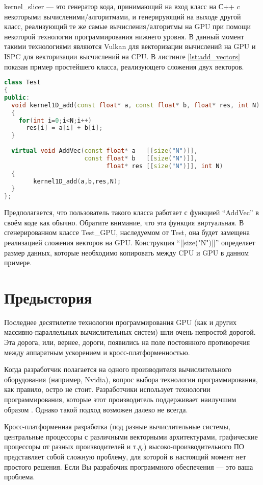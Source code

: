 \documentclass[11pt,fleqn,english,russian]{report} %
\begin{document}
kernel\_slicer --- это генератор кода, принимающий на вход класс на С++ c некоторыми вычисленими/алгоритмами, и генерирующий на выходе другой класс, реализующий те же самые вычисления/алгоритмы на GPU при помощи некоторой технологии программирования нижнего уровня. В данный момент такими технологиями являются Vulkan для векторизации вычислений на GPU и ISPC для векторизации высчислений на CPU. В листинге \ref{lst:add_vectors} показан пример простейшего класса, реализующего сложения двух векторов.

\begin{lstlisting}[language=C++, caption=сложение двух векторов]
class Test 
{
public:	
  void kernel1D_add(const float* a, const float* b, float* res, int N) 
  {
    for(int i=0;i<N;i++)
      res[i] = a[i] + b[i];
  } 
	
  virtual void AddVec(const float* a   [[size("N")]], 
                      const float* b   [[size("N")]], 
                            float* res [[size("N")]], int N) 
  {
		kernel1D_add(a,b,res,N); 
  } 	
};
\end{lstlisting}\label{lst:add_vectors}

Предполагается, что пользователь такого класса работает с функцией ``AddVec'' в своём коде как обычно. Обратите внимание, что эта функция виртуальная. В сгенерированном классе Test\_GPU, наследуемом от Test, она будет замещена реализацией сложения векторов на GPU. Конструкция ``[[size("N")]]'' определяет размер данных, которые необходимо копировать между CPU и GPU в данном примере.

\section{Предыстория}

Последнее десятилетие технологии программирования GPU (как и других массивно-параллельных вычислительных систем) шли очень непростой дорогой. Эта дорога, или, вернее, дороги, появились на поле постоянного противоречия между аппаратным ускорением и кросс-платформенностью. 

Когда разработчик полагается на одного производителя вычислительного оборудования (например, Nvidia), вопрос выбора технологии программирования, как правило, остро не стоит. Разработчики использует технологии программирования, которые этот производитель поддерживает наилучшим образом \cite{NVCPP,CUDA,OpenACC}. Однако такой подход возможен далеко не всегда. 

Кросс-платформенная разработка (под разные вычислительные системы, центральные процессоры с различными векторными архитектурами, графические процессоры от разных производителей и т.д.)  высоко-производительного ПО представляет собой сложную проблему, для которой в настоящий момент нет простого решения. Если Вы разрабочик программного обеспечения --- это ваша проблема.
\end{document}
